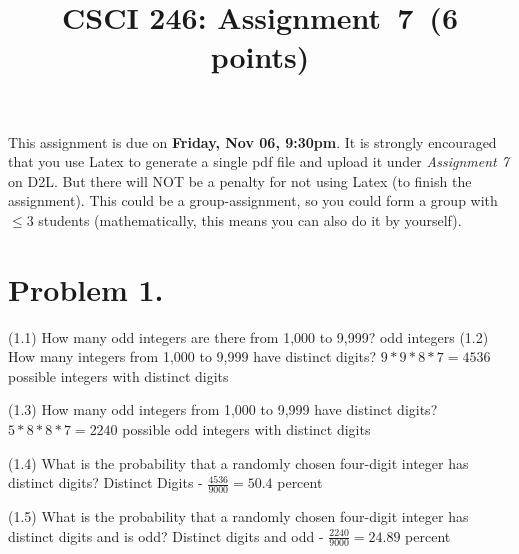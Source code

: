 \documentclass[11pt]{article}
\begin{document}
\date{}

\title{CSCI 246: Assignment~7~(6 points)}


\maketitle


\noindent
This assignment is due on {\bf Friday, Nov 06, 9:30pm}. It is strongly
encouraged that you use Latex to generate a single pdf file and upload it
under {\em Assignment 7} on D2L. But there will NOT be a penalty for not
using Latex (to finish the assignment). This could be a group-assignment,
so you could form a group with $\leq 3$ students (mathematically, this means
you can also do it by yourself).
\newline
 
\section*{Problem 1.}

\noindent
(1.1) How many odd integers are there from 1,000 to 9,999?
\newline
{} odd integers
\newline
\newline
\noindent
(1.2) How many integers from 1,000 to 9,999 have distinct digits?
\newline
\newline
$9 * 9 * 8 * 7 = 4536$ possible integers with distinct digits
\newline
\newline


\noindent
(1.3) How many odd integers from 1,000 to 9,999 have distinct digits?
\newline
\newline
$5 * 8 * 8 * 7 = 2240$ possible odd integers with distinct digits
\newline
\newline


\noindent
(1.4) What is the probability that a randomly chosen four-digit integer has distinct digits?
\newline
\newline
Distinct Digits - $\frac{4536}{9000} = 50.4 $ percent
\newline


\noindent
(1.5) What is the probability that a randomly chosen four-digit integer has distinct digits and is odd?
\newline
Distinct digits and odd - $\frac{2240}{9000} = 24.89$ percent
\newpage
\end{document}
